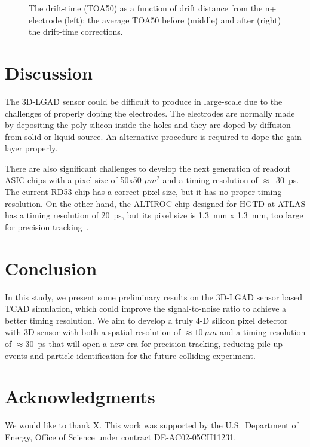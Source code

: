 \documentclass[aps,pt14,superscriptaddress,floatfix,nofootinbib]{revtex4}
\begin{document}
\begin{figure}[hbtp]
\begin{center}
\caption{The drift-time (TOA50) as a function of drift distance from the n+ electrode (left); the average TOA50 before (middle) and 
after (right) the drift-time corrections.~\label{fig:kdettoa}}
\end{center}
\end{figure}

\section{Discussion}
\label{sec:discussion} 

The 3D-LGAD sensor could be difficult to
produce in large-scale due to the challenges of properly doping the electrodes.
The electrodes are normally made by depositing the poly-silicon inside the holes and
they are doped by diffusion from solid or liquid source.
An alternative procedure is required to dope the gain layer properly. 

There are also significant challenges to develop the next generation of readout ASIC chips with
a pixel size of 50x50 $\mu m^2$ and a timing resolution of $\approx$~30~ps.
The current RD53 chip has a correct pixel size, but it has no proper
timing resolution. On the other hand, the ALTIROC chip designed for HGTD at ATLAS has
a timing resolution of 20~ps, but its pixel size is 1.3~mm x 1.3~mm,
too large for precision tracking~\cite{delaTaille:2018qap}.

\section{Conclusion}
\label{sec:conclusion} 

In this study, we present some preliminary results on the 3D-LGAD sensor based TCAD simulation, which
could improve the signal-to-noise ratio to achieve a better timing resolution.
We aim to develop a truly 4-D silicon pixel detector with 3D sensor with both a spatial
resolution of $\approx 10~\mu m$ and a timing resolution of $\approx$30~ps
that  will open a new era for precision tracking, reducing pile-up
events and particle identification for the future colliding experiment.

\section*{Acknowledgments}

We would like to thank X.  This work was supported by the U.S.~Department of Energy, Office of Science under contract DE-AC02-05CH11231. 


\def\bibname{\Large\bf References}
\def\refname{\Large\bf References}
\pagestyle{plain}

\end{document}
